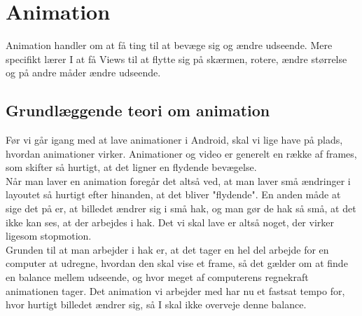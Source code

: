 
\chapter{Animation}
Animation handler om at få ting til at bevæge sig og ændre udseende. Mere specifikt lærer I at få Views til at flytte sig på skærmen, rotere, ændre størrelse og på andre måder ændre udseende.
\section{Grundlæggende teori om animation}
Før vi går igang med at lave animationer i Android, skal vi lige have på plads, hvordan animationer virker.
Animationer og video er generelt en række af \gls{frame}s, som skifter så hurtigt, at det ligner en flydende bevægelse. \\
Når man laver en animation foregår det altså ved, at man laver små ændringer i layoutet så hurtigt efter hinanden, at det bliver "flydende". En anden måde at sige det på er, at billedet ændrer sig i små hak, og man gør de hak så små, at det ikke kan ses, at der arbejdes i hak. Det vi skal lave er altså noget, der virker ligesom stopmotion. \\
Grunden til at man arbejder i hak er, at det tager en hel del arbejde for en computer  at udregne, hvordan den skal vise et frame, så det gælder om at finde en balance mellem udseende, og hvor meget af computerens regnekraft animationen tager. Det animation vi arbejder med har nu et fastsat tempo for, hvor hurtigt billedet ændrer sig, så I skal ikke overveje denne balance.
